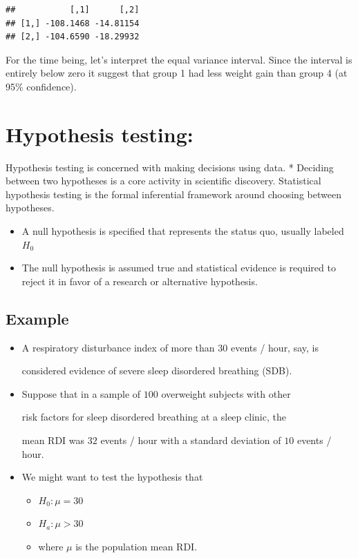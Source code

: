 \documentclass[]{article}
\begin{document}
\begin{verbatim}
##           [,1]      [,2]
## [1,] -108.1468 -14.81154
## [2,] -104.6590 -18.29932
\end{verbatim}

For the time being, let's interpret the equal variance interval. Since
the interval is entirely below zero it suggest that group 1 had less
weight gain than group 4 (at 95\% confidence).

\hypertarget{hypothesis-testing}{%
\section{Hypothesis testing:}\label{hypothesis-testing}}

Hypothesis testing is concerned with making decisions using data. *
Deciding between two hypotheses is a core activity in scientific
discovery. Statistical hypothesis testing is the formal inferential
framework around choosing between hypotheses.

\begin{itemize}
\item
  A null hypothesis is specified that represents the status quo, usually
  labeled \(H_0\)
\item
  The null hypothesis is assumed true and statistical evidence is
  required to reject it in favor of a research or alternative
  hypothesis.
\end{itemize}

\hypertarget{example}{%
\subsection{Example}\label{example}}

\begin{itemize}
\item
  A respiratory disturbance index of more than \(30\) events / hour,
  say, is

  considered evidence of severe sleep disordered breathing (SDB).
\item
  Suppose that in a sample of \(100\) overweight subjects with other

  risk factors for sleep disordered breathing at a sleep clinic, the

  mean RDI was \(32\) events / hour with a standard deviation of \(10\)
  events / hour.
\item
  We might want to test the hypothesis that

  \begin{itemize}
  \item
    \(H_0 : \mu = 30\)
  \item
    \(H_a : \mu > 30\)
  \item
    where \(\mu\) is the population mean RDI.
  \end{itemize}
\end{itemize}
\end{document}
